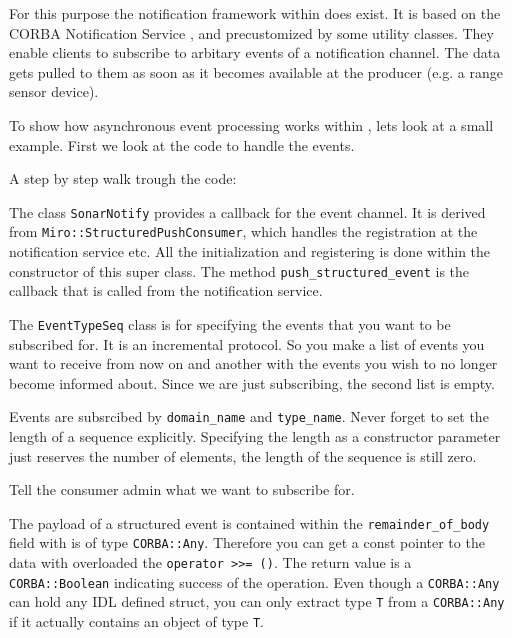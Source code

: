 For this purpose the notification framework within \miro does
exist. It is based on the CORBA Notification Service \cite{OMG:00-5},
and precustomized by some utility classes. They enable clients to
subscribe to arbitary events of a notification channel. The data gets
pulled to them as soon as it becomes available at the producer (e.g. a
range sensor device).

To show how asynchronous event processing works within \miro, lets
look at a small example. First we look at the code to handle the
events.


\label{lst:SonarNotify}

A step by step walk trough the code:



The class \lstinline!SonarNotify! provides a callback for the event
channel. It is derived from \lstinline!Miro::StructuredPushConsumer!,
which handles the registration at the notification service etc. All
the initialization and registering is done within the constructor of
this super class. The method \lstinline!push_structured_event! is the
callback that is called from the notification service.



The \lstinline!EventTypeSeq! class is for specifying the events that you
want to be subscribed for. It is an incremental protocol. So you make
a list of events you want to receive from now on and another with the
events you wish to no longer become informed about. Since we are just
subscribing, the second list is empty.



Events are subsrcibed by \lstinline!domain_name! and
\lstinline!type_name!. Never forget to set the length of a sequence
explicitly. Specifying the length as a constructor parameter just
reserves the number of elements, the length of the sequence is still
zero.



Tell the consumer admin what we want to subscribe for.



The payload of a structured event is contained within the
\lstinline!remainder_of_body! field with is of type
\lstinline!CORBA::Any!.  Therefore you can get a const pointer to the
data with overloaded the \lstinline!operator >>= ()!. The return value
is a \lstinline!CORBA::Boolean! indicating success of the operation.
Even though a \lstinline!CORBA::Any! can hold any IDL defined struct,
you can only extract type \lstinline!T! from a \lstinline!CORBA::Any!
if it actually contains an object of type \lstinline!T!.

